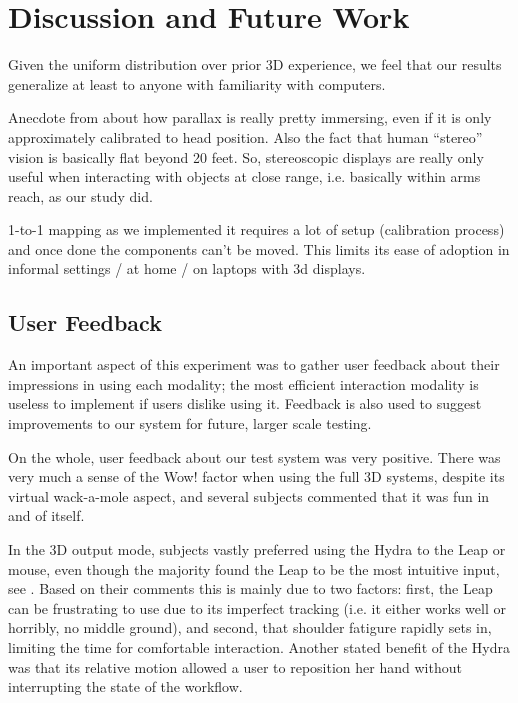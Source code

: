 \section{Discussion and Future Work}\label{sec:discussion}

Given the uniform distribution over prior 3D experience, we feel that our
results generalize at least to anyone with familiarity with computers.

Anecdote from \cite{leewii} about how parallax is really pretty immersing,
even if it is only approximately calibrated to head position.  Also the fact
that human ``stereo'' vision is basically flat beyond 20 feet.  So, stereoscopic
displays are really only useful when interacting with objects at close range,
i.e. basically within arms reach, as our study did.

1-to-1 mapping as we implemented it requires a lot of setup (calibration process) and once done the components can't be moved.  This limits its ease of adoption in informal settings / at home / on laptops with 3d displays.

\subsection{User Feedback}\label{sec:feedback}

An important aspect of this experiment was to gather user feedback about their
impressions in using each modality; the most efficient interaction modality is
useless to implement if users dislike using it.  Feedback is also used to
suggest improvements to our system for future, larger scale testing.

On the whole, user feedback about our test system was very positive.  There
was very much a sense of the Wow! factor when using the full 3D systems,
despite its virtual wack-a-mole aspect, and several subjects commented that it
was fun in and of itself.

In the 3D output mode, subjects vastly preferred using the Hydra to the Leap
or mouse, even though the majority found the Leap to be the most intuitive
input, see .  Based on their comments this is mainly due to
two factors: first, the Leap can be frustrating to use due to its imperfect
tracking (i.e. it either works well or horribly, no middle ground), and
second, that shoulder fatigure rapidly sets in, limiting the time for
comfortable interaction.  Another stated benefit of the Hydra was that its
relative motion allowed a user to reposition her hand without interrupting the
state of the workflow.

